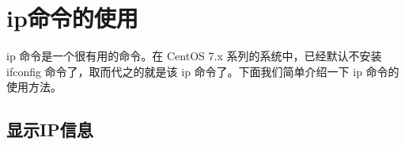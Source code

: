 \section{ip命令的使用}
\label{sec:ipCmd}

ip 命令是一个很有用的命令。在 CentOS 7.x 系列的系统中，已经默认不安装 ifconfig 命令了，取而代之的就是该 ip 命令了。下面我们简单介绍一下 ip 命令的使用方法。

\subsection{显示IP信息}

